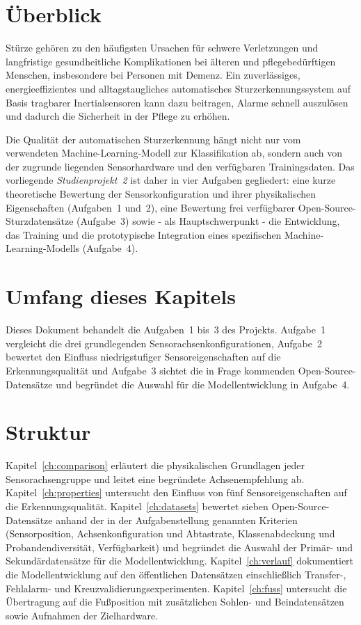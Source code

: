 \documentclass[11pt,a4paper,oneside]{report}
\begin{document}
\section{Überblick}
Stürze gehören zu den häufigsten Ursachen für schwere Verletzungen und
langfristige gesundheitliche Komplikationen bei älteren und pflegebedürftigen
Menschen, insbesondere bei Personen mit Demenz. Ein zuverlässiges,
energieeffizientes und alltagstaugliches automatisches Sturzerkennungssystem
auf Basis tragbarer Inertialsensoren kann dazu beitragen, Alarme schnell
auszulösen und dadurch die Sicherheit in der Pflege zu erhöhen.

Die Qualität der automatischen Sturzerkennung hängt nicht nur vom verwendeten
Machine-Learning-Modell zur Klassifikation ab, sondern auch von der zugrunde
liegenden Sensorhardware und den verfügbaren Trainingsdaten. Das vorliegende
\emph{Studienprojekt~2} ist daher in vier Aufgaben gegliedert: eine kurze
theoretische Bewertung der Sensorkonfiguration und ihrer physikalischen
Eigenschaften (Aufgaben~1 und~2), eine Bewertung frei verfügbarer
Open-Source-Sturzdatensätze (Aufgabe~3) sowie - als Hauptschwerpunkt - die
Entwicklung, das Training und die prototypische Integration eines spezifischen
Machine-Learning-Modells (Aufgabe~4).

\section{Umfang dieses Kapitels}
Dieses Dokument behandelt die Aufgaben~1 bis~3 des Projekts. Aufgabe~1
vergleicht die drei grundlegenden Sensorachsenkonfigurationen, Aufgabe~2
bewertet den Einfluss niedrigstufiger Sensoreigenschaften auf die
Erkennungsqualität und Aufgabe~3 sichtet die in Frage kommenden
Open-Source-Datensätze und begründet die Auswahl für die
Modellentwicklung in Aufgabe~4.

\section{Struktur}
Kapitel~\ref{ch:comparison} erläutert die physikalischen Grundlagen jeder
Sensorachsengruppe und leitet eine begründete Achsenempfehlung ab.
Kapitel~\ref{ch:properties} untersucht den Einfluss von fünf
Sensoreigenschaften auf die Erkennungsqualität.
Kapitel~\ref{ch:datasets} bewertet sieben Open-Source-Datensätze anhand
der in der Aufgabenstellung genannten Kriterien (Sensorposition,
Achsenkonfiguration und Abtastrate, Klassenabdeckung und Probanden\-diversität,
Verfügbarkeit) und begründet die Auswahl der Primär- und
Sekundärdatensätze für die Modellentwicklung.
Kapitel~\ref{ch:verlauf} dokumentiert die Modellentwicklung auf den
öffentlichen Datensätzen einschließlich Transfer-, Fehlalarm- und
Kreuzvalidierungsexperimenten. Kapitel~\ref{ch:fuss} untersucht die
Übertragung auf die Fußposition mit zusätzlichen Sohlen- und
Beindatensätzen sowie Aufnahmen der Zielhardware.
\end{document}
